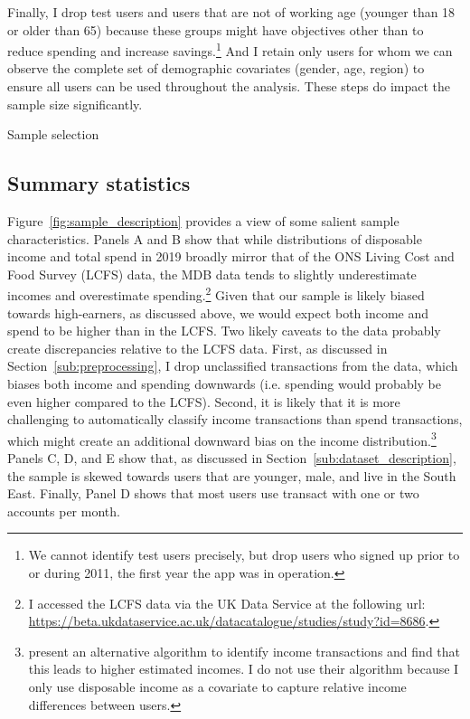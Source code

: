 Finally, I drop test users and users that are not of working age (younger than
18 or older than 65) because these groups might have objectives other than to
reduce spending and increase savings.\footnote{We cannot identify test users
    precisely, but drop users who signed up prior to or during 2011, the first
year the app was in operation.} And I retain only users for whom we can observe
the complete set of demographic covariates (gender, age, region) to ensure all
users can be used throughout the analysis. These steps do impact the sample
size significantly.

\begin{table}
\centering\footnotesize
\caption{Sample selection}\label{tab:selection}

\end{table}


\subsection{Summary statistics}%
\label{sub:summary_statistics}

Figure~\ref{fig:sample_description} provides a view of some salient sample
characteristics. Panels A and B show that while distributions of disposable
income and total spend in 2019 broadly mirror that of the ONS Living Cost and
Food Survey (LCFS) data, the MDB data tends to slightly underestimate incomes
and overestimate spending.\footnote{I accessed the LCFS data via the UK Data
Service at the following url:
\url{https://beta.ukdataservice.ac.uk/datacatalogue/studies/study?id=8686}.}
Given that our sample is likely biased towards high-earners, as discussed
above, we would expect both income and spend to be higher than in the LCFS. Two
likely caveats to the data probably create discrepancies relative to the LCFS
data. First, as discussed in Section~\ref{sub:preprocessing}, I drop
unclassified transactions from the data, which biases both income and spending
downwards (i.e. spending would probably be even higher compared to the LCFS).
Second, it is likely that it is more challenging to automatically classify
income transactions than spend transactions, which might create an additional
downward bias on the income distribution.\footnote{\citet{bourquin2020effects}
    present an alternative algorithm to identify income transactions and find
that this leads to higher estimated incomes. I do not use their algorithm
because I only use disposable income as a covariate to capture relative income
differences between users.} Panels C, D, and E show that, as discussed in
Section~\ref{sub:dataset_description}, the sample is skewed towards users that
are younger, male, and live in the South East. Finally, Panel D shows that most
users use transact with one or two accounts per month.

